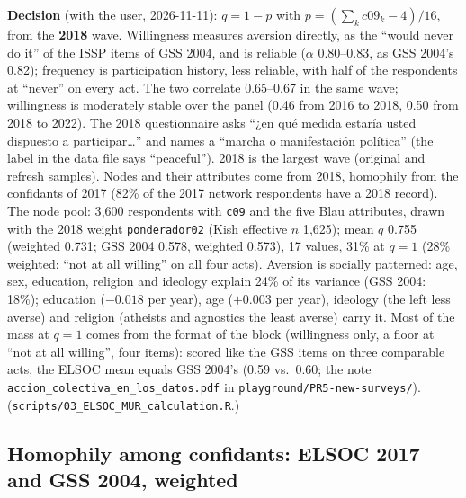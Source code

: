 \documentclass[11pt,a4paper]{article}
\newcommand{\code}[1]{\texttt{#1}}
\begin{document}
\noindent\textbf{Decision} (with the user, 2026-11-11): $q = 1 - p$ with
$p = (\sum_k c09_k - 4)/16$, from the \textbf{2018} wave. Willingness measures aversion directly,
as the ``would never do it'' of the ISSP items of GSS 2004, and is reliable ($\alpha$ 0.80--0.83,
as GSS 2004's 0.82); frequency is participation history, less reliable, with half of the
respondents at ``never'' on every act. The two correlate 0.65--0.67 in the same wave; willingness
is moderately stable over the panel (0.46 from 2016 to 2018, 0.50 from 2018 to 2022). The 2018
questionnaire asks ``¿en qué medida estaría usted dispuesto a participar\ldots'' and names a ``marcha o
manifestación política'' (the label in the data file says ``peaceful''). 2018 is the largest wave
(original and refresh samples). Nodes and their attributes come from 2018, homophily from the
confidants of 2017 (82\% of the 2017 network respondents have a 2018 record). The node pool:
3{,}600 respondents with \code{c09} and the five Blau attributes, drawn with the 2018 weight
\code{ponderador02} (Kish effective $n$ 1{,}625); mean $q$ 0.755 (weighted 0.731; GSS 2004 0.578,
weighted 0.573), 17 values, 31\% at $q = 1$ (28\% weighted: ``not at all willing'' on all four acts).
Aversion is socially patterned: age, sex, education, religion and ideology explain 24\% of its variance
(GSS 2004: 18\%); education ($-0.018$ per year), age ($+0.003$ per year), ideology (the left less averse)
and religion (atheists and agnostics the least averse) carry it. Most of the mass at $q = 1$ comes from the
format of the block (willingness only, a floor at ``not at all willing'', four items): scored like the GSS
items on three comparable acts, the ELSOC mean equals GSS 2004's (0.59 vs.\ 0.60; the note
\code{accion\_colectiva\_en\_los\_datos.pdf} in \code{playground/PR5-new-surveys/}).
(\code{scripts/03\_ELSOC\_MUR\_calculation.R}.)

\subsection{Homophily among confidants: ELSOC 2017 and GSS 2004, weighted}
\label{sec:pr5homophily}
\end{document}
